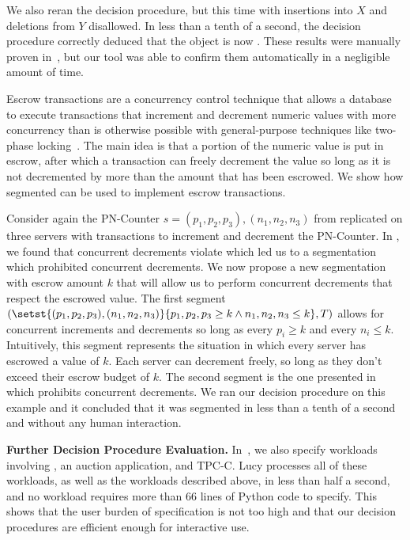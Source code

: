 We also reran the decision procedure, but this time with insertions into $X$
and deletions from $Y$ disallowed. In less than a tenth of a second, the
decision procedure correctly deduced that the object is now
\invariantconfluent{}. These results were manually proven
in~\cite{bailis2014coordination}, but our tool was able to confirm them
automatically in a negligible amount of time.

Escrow transactions are a concurrency control technique that allows a database
to execute transactions that increment and decrement numeric values with more
concurrency than is otherwise possible with general-purpose techniques like
two-phase locking~\cite{o1986escrow}. The main idea is that a portion of the
numeric value is put in escrow, after which a transaction can freely decrement
the value so long as it is not decremented by more than the amount that has
been escrowed. We show how segmented \invariantconfluence{} can be used to
implement escrow transactions.

Consider again the PN-Counter $s = (p_1, p_2, p_3), (n_1, n_2, n_3)$ from
 replicated on three servers with transactions
to increment and decrement the PN-Counter. In
, we found that concurrent decrements violate
\invariantconfluence{} which led us to a segmentation which prohibited
concurrent decrements. We now propose a new segmentation with escrow amount $k$
that will allow us to perform concurrent decrements that respect the escrowed
value. The first segment $(\setst{(p_1, p_2, p_3), (n_1, n_2, n_3)}{p_1, p_2,
p_3 \geq k \land n_1, n_2, n_3 \leq k}, T)$ allows for concurrent increments
and decrements so long as every $p_i \geq k$ and every $n_i \leq k$.
Intuitively, this segment represents the situation in which every server has
escrowed a value of $k$. Each server can decrement freely, so long as they don't
exceed their escrow budget of $k$. The second segment is the one presented in
 which prohibits concurrent decrements. We ran
our decision procedure on this example and it concluded that it was segmented
\invariantconfluent{} in less than a tenth of a second and without any human
interaction.

\vspace{4pt}
\textbf{Further Decision Procedure Evaluation.}
In~\cite{whittaker2018interactive}, we also specify workloads involving
, an auction application, and TPC-C. Lucy processes all of
these workloads, as well as the workloads described above, in less than half a
second, and no workload requires more than 66 lines of Python code to specify.
This shows that the user burden of specification is not too high and that our
decision procedures are efficient enough for interactive use.

